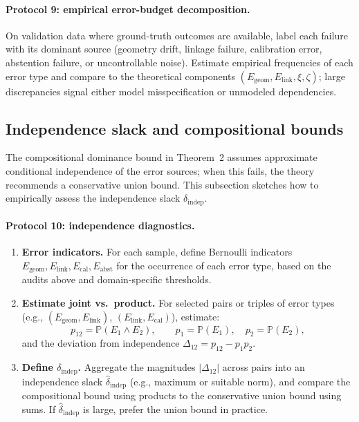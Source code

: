 \documentclass[11pt]{article}
\begin{document}
\paragraph{Protocol 9: empirical error-budget decomposition.}

On validation data where ground-truth outcomes are available, label each
failure with its dominant source (geometry drift, linkage failure, calibration
error, abstention failure, or uncontrollable noise). Estimate empirical
frequencies of each error type and compare to the theoretical components
$(E_{\mathrm{geom}},E_{\mathrm{link}},\xi,\zeta)$; large discrepancies signal
either model misspecification or unmodeled dependencies.

\subsection{Independence slack and compositional bounds}

The compositional dominance bound in Theorem~2 assumes approximate
conditional independence of the error sources; when this fails, the theory
recommends a conservative union bound. This subsection sketches how to
empirically assess the independence slack $\delta_{\mathrm{indep}}$.

\paragraph{Protocol 10: independence diagnostics.}

\begin{enumerate}[label=(\arabic*)]
\item \textbf{Error indicators.} For each sample, define Bernoulli indicators
  $E_{\mathrm{geom}}, E_{\mathrm{link}}, E_{\mathrm{cal}}, E_{\mathrm{abst}}$
  for the occurrence of each error type, based on the audits above and
  domain-specific thresholds.
\item \textbf{Estimate joint vs.\ product.} For selected pairs or triples
  of error types (e.g., $(E_{\mathrm{geom}},E_{\mathrm{link}})$,
  $(E_{\mathrm{link}},E_{\mathrm{cal}})$), estimate:
  \[
  p_{12} = \mathbb{P}(E_1 \land E_2),\qquad
  p_1 = \mathbb{P}(E_1),\quad p_2 = \mathbb{P}(E_2),
  \]
  and the deviation from independence
  $\Delta_{12} = p_{12} - p_1 p_2$.
\item \textbf{Define $\delta_{\mathrm{indep}}$.} Aggregate the magnitudes
  $|\Delta_{12}|$ across pairs into an independence slack
  $\widehat{\delta}_{\mathrm{indep}}$ (e.g., maximum or suitable norm),
  and compare the compositional bound using products to the conservative
  union bound using sums. If $\widehat{\delta}_{\mathrm{indep}}$ is large,
  prefer the union bound in practice.
\end{enumerate}
\end{document}
